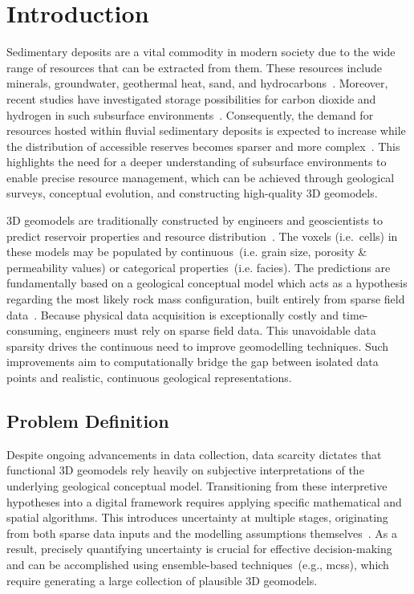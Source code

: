 \chapter{Introduction}
Sedimentary deposits are a vital commodity in modern society due to the wide range of resources that can be extracted from them. These resources include minerals, groundwater, geothermal heat, sand, and hydrocarbons~\parencite[e.g.,][]{morris2007genesis, donselaar2017relation, donselaar2015reservoir, brekke2001sedimentary}. Moreover, recent studies have investigated storage possibilities for carbon dioxide and hydrogen in such subsurface environments~\parencite{zhou2020dynamic, heinemann2021enabling}. Consequently, the demand for resources hosted within fluvial sedimentary deposits is expected to increase while the distribution of accessible reserves becomes sparser and more complex~\parencite[e.g.,][]{spittler2020modelling, calvo2016decreasing}. This highlights the need for a deeper understanding of subsurface environments to enable precise resource management, which can be achieved through geological surveys, conceptual evolution, and constructing high-quality 3D geomodels.

3D geomodels are traditionally constructed by engineers and geoscientists to predict reservoir properties and resource distribution~\parencite{song2022review, royer20153d}. The voxels (i.e.~cells) in these models may be populated by continuous~(i.e. grain size, porosity \& permeability values) or categorical properties~(i.e. facies). The predictions are fundamentally based on a geological conceptual model which acts as a hypothesis regarding the most likely rock mass configuration, built entirely from sparse field data~\parencite{koltermann1996heterogeneity}. Because physical data acquisition is exceptionally costly and time-consuming, engineers must rely on sparse field data. This unavoidable data sparsity drives the continuous need to improve geomodelling techniques. Such improvements aim to computationally bridge the gap between isolated data points and realistic, continuous geological representations.

\section{Problem Definition}
Despite ongoing advancements in data collection, data scarcity dictates that functional 3D geomodels rely heavily on subjective interpretations of the underlying geological conceptual model. Transitioning from these interpretive hypotheses into a digital framework requires applying specific mathematical and spatial algorithms. This introduces uncertainty at multiple stages, originating from both sparse data inputs and the modelling assumptions themselves~\parencite{hoyer2024evaluating}. As a result, precisely quantifying uncertainty is crucial for effective decision-making and can be accomplished using ensemble-based techniques~(e.g., \glspl{mcs}), which require generating a large collection of plausible 3D geomodels.

